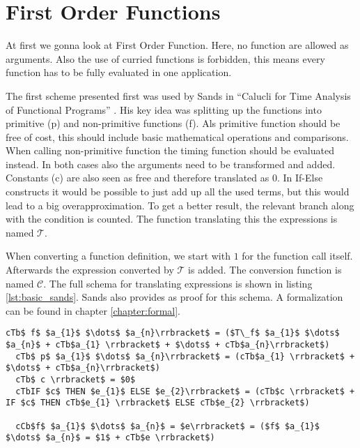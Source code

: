 
\section{First Order Functions} \label{chapter:first_order}

At first we gonna look at First Order Function.
Here, no function are allowed as arguments.
Also the use of curried functions is forbidden, this means every function has to be fully evaluated in one application.

The first scheme presented first was used by Sands in ``Calucli for Time Analysis of Functional Programs'' \parencite{sands}.
His key idea was splitting up the functions into primitive (p) and non-primitive functions (f).
Als primitive function should be free of cost, this should include basic mathematical operations and comparisons.
When calling non-primitive function the timing function should be evaluated instead.
In both cases also the arguments need to be transformed and added.
Constants (c) are also seen as free and therefore translated as 0.
In If-Else constructs it would be possible to just add up all the used terms,
but this would lead to a big overapproximation.
To get a better result, the relevant branch along with the condition is counted.
The function translating this the expressions is named $\mathcal{T}$.

When converting a function definition, we start with $1$ for the function call itself.
Afterwards the expression converted by $\mathcal{T}$ is added.
The conversion function is named $\mathcal{C}$.
The full schema for translating expressions is shown in listing \ref{lst:basic_sands}.
Sands also provides as proof for this schema. A formalization can be found in chapter \ref{chapter:formal}.

\begin{lstlisting}[language=translation,label=lst:basic_sands,caption=Translation schema for first order functions by Sands,mathescape=true]
  cTb$ f$ $a_{1}$ $\dots$ $a_{n}\rrbracket$ = ($T\_f$ $a_{1}$ $\dots$ $a_{n}$ + cTb$a_{1} \rrbracket$ + $\dots$ + cTb$a_{n}\rrbracket$)
  cTb$ p$ $a_{1}$ $\dots$ $a_{n}\rrbracket$ = (cTb$a_{1} \rrbracket$ + $\dots$ + cTb$a_{n}\rrbracket$)
  cTb$ c \rrbracket$ = $0$
  cTbIF $c$ THEN $e_{1}$ ELSE $e_{2}\rrbracket$ = (cTb$c \rrbracket$ + IF $c$ THEN cTb$e_{1} \rrbracket$ ELSE cTb$e_{2} \rrbracket$)

  cCb$f$ $a_{1}$ $\dots$ $a_{n}$ = $e\rrbracket$ = ($f$ $a_{1}$ $\dots$ $a_{n}$ = $1$ + cTb$e \rrbracket$)
\end{lstlisting}

